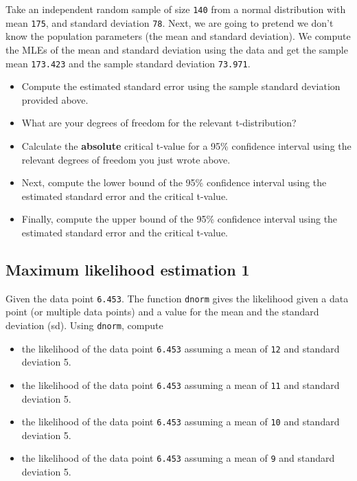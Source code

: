 \documentclass[12pt,]{krantz}
\providecommand{\tightlist}{%
  \setlength{\itemsep}{0pt}\setlength{\parskip}{0pt}}
\theoremstyle{definition}
\theoremstyle{definition}
\theoremstyle{definition}
\theoremstyle{remark}
\begin{document}
Take an independent random sample of size \texttt{140} from a normal distribution
with mean \texttt{175}, and standard deviation \texttt{78}. Next, we are going to pretend we don't know the population parameters (the mean and standard deviation). We compute the MLEs of the mean and standard deviation using the data and get the sample mean \texttt{173.423} and the sample standard deviation \texttt{73.971}.

\begin{itemize}
\tightlist
\item
  Compute the estimated standard error using the sample standard deviation provided above.
\item
  What are your degrees of freedom for the relevant t-distribution?
\item
  Calculate the \textbf{absolute} critical t-value for a 95\% confidence interval using the relevant degrees of freedom you just wrote above.
\item
  Next, compute the lower bound of the 95\% confidence interval using the estimated standard error and the critical t-value.
\item
  Finally, compute the upper bound of the 95\% confidence interval using the estimated standard error and the critical t-value.
\end{itemize}

\hypertarget{maximum-likelihood-estimation-1}{%
\subsection{Maximum likelihood estimation 1}\label{maximum-likelihood-estimation-1}}

Given the data point \texttt{6.453}.
The function \texttt{dnorm} gives the likelihood given a data point (or multiple data points) and a value for the mean and the standard deviation (sd). Using \texttt{dnorm}, compute

\begin{itemize}
\tightlist
\item
  the likelihood of the data point \texttt{6.453} assuming a mean of \texttt{12} and standard deviation 5.
\item
  the likelihood of the data point \texttt{6.453} assuming a mean of \texttt{11} and standard deviation 5.
\item
  the likelihood of the data point \texttt{6.453} assuming a mean of \texttt{10} and standard deviation 5.
\item
  the likelihood of the data point \texttt{6.453} assuming a mean of \texttt{9} and standard deviation 5.
\end{itemize}
\end{document}

